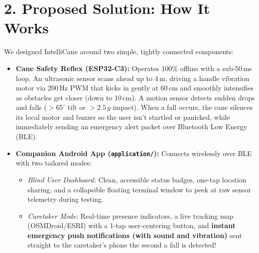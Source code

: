 \documentclass[10pt,a4paper]{article}
\begin{document}
\section{2. Proposed Solution: How It Works}
We designed IntelliCane around two simple, tightly connected components:
\begin{itemize}
    \item \textbf{Cane Safety Reflex (ESP32-C3):} Operates 100\% offline with a sub-50\,ms loop. An ultrasonic sensor scans ahead up to 4\,m, driving a handle vibration motor via 200\,Hz PWM that kicks in gently at 60\,cm and smoothly intensifies as obstacles get closer (down to 10\,cm). A motion sensor detects sudden drops and falls ($>65^\circ$ tilt or $>2.5\,g$ impact). When a fall occurs, the cane silences its local motor and buzzer so the user isn't startled or panicked, while immediately sending an emergency alert packet over Bluetooth Low Energy (BLE).
    \item \textbf{Companion Android App (\texttt{application/}):} Connects wirelessly over BLE with two tailored modes:
    \begin{itemize}
        \item \textit{Blind User Dashboard:} Clean, accessible status badges, one-tap location sharing, and a collapsible floating terminal window to peek at raw sensor telemetry during testing.
        \item \textit{Caretaker Mode:} Real-time presence indicators, a live tracking map (OSMDroid/ESRI) with a 1-tap user-centering button, and \textbf{instant emergency push notifications (with sound and vibration)} sent straight to the caretaker's phone the second a fall is detected!
    \end{itemize}
\end{itemize}

\end{document}
